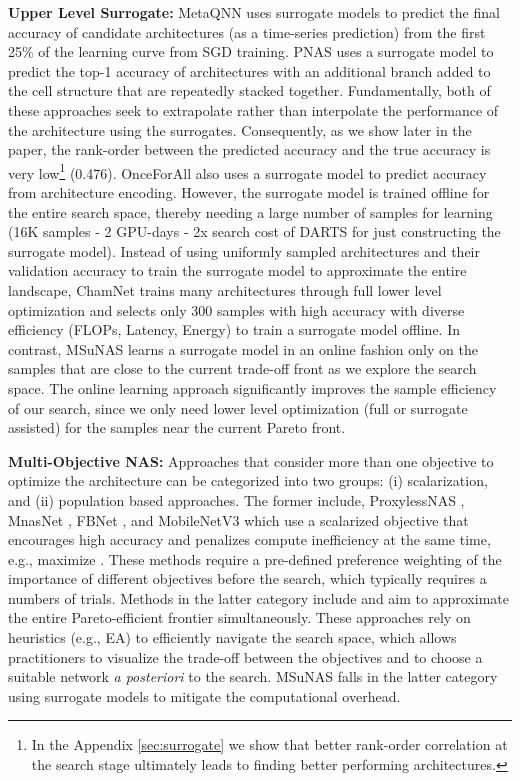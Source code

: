 \documentclass[runningheads]{llncs}
\def\ourmethod{MSuNAS}
\begin{document}
\vspace{5pt}
\noindent\textbf{Upper Level Surrogate:} MetaQNN \cite{baker2017accelerating} uses surrogate models to predict the final accuracy of candidate architectures (as a time-series prediction) from the first 25\% of the learning curve from SGD training. PNAS \cite{PNAS} uses a surrogate model to predict the top-1 accuracy of architectures with an additional branch added to the cell structure that are repeatedly stacked together. Fundamentally, both of these approaches seek to extrapolate rather than interpolate the performance of the architecture using the surrogates. Consequently, as we show later in the paper, the rank-order between the predicted accuracy and the true accuracy is very low\footnote{In the Appendix \ref{sec:surrogate} we show that better rank-order correlation at the search stage ultimately leads to finding better performing architectures.} (0.476). OnceForAll \cite{onceforall} also uses a surrogate model to predict accuracy from architecture encoding. However, the surrogate model is trained offline for the entire search space, thereby needing a large number of samples for learning (16K samples - 2 GPU-days - 2x search cost of DARTS for just constructing the surrogate model). Instead of using uniformly sampled architectures and their validation accuracy to train the surrogate model to approximate the entire landscape, ChamNet \cite{chamnet} trains many architectures through full lower level optimization and selects only 300 samples with high accuracy with diverse efficiency (FLOPs, Latency, Energy) to train a surrogate model offline. In contrast, \ourmethod{} learns a surrogate model in an online fashion only on the samples that are close to the current trade-off front as we explore the search space. The online learning approach significantly improves the sample efficiency of our search, since we only need lower level optimization (full or surrogate assisted) for the samples near the current Pareto front.

\vspace{5pt}
\noindent\textbf{Multi-Objective NAS:} Approaches that consider more than one objective to optimize the architecture can be categorized into two groups: (i) scalarization, and (ii) population based approaches. The former include, ProxylessNAS \cite{proxylessnas}, MnasNet \cite{mnasnet}, FBNet \cite{fbnet}, and MobileNetV3 \cite{mobilenetv3} which use a scalarized objective that encourages high accuracy and penalizes compute inefficiency at the same time, e.g., maximize . These methods require a pre-defined preference weighting of the importance of different objectives before the search, which typically requires a numbers of trials. Methods in the latter category include \cite{NSGANet,LEMONADE,dppnet,chu2019fairnas,muxconv} and aim to approximate the entire Pareto-efficient frontier simultaneously. These approaches rely on heuristics (e.g., EA) to efficiently navigate the search space, which allows practitioners to visualize the trade-off between the objectives and to choose a suitable network \emph{a posteriori} to the search. \ourmethod{} falls in the latter category using surrogate models to mitigate the computational overhead.
\end{document}
